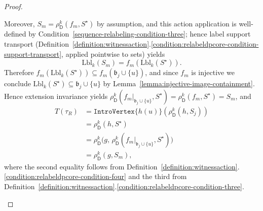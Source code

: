 \documentclass[10pt,a4paper]{amsart}
\newcommand{\abag}{\mathfrak{b}}
\newcommand{\abstractdecomposition}{\tau}
\newcommand{\action}{\rho}
\newcommand{\dpcore}{\mathsf{D}}
\newcommand{\dprefutation}{R}
\newcommand{\introvertextype}[1]{\mathtt{IntroVertex}\{#1\}}
\newcommand{\relabelingfunction}{f}
\newcommand{\subtermToBag}{T}
\newcommand{\treewidthvalue}{k}
\newcommand{\vertexone}{u}
\newcommand{\witnessset}{S}
\begin{document}
\begin{proof}
\begin{enumerate}
	Moreover, $\witnessset_m=\action_{\dpcore}^{\treewidthvalue}(\relabelingfunction_m,S^\star)$ by assumption, and this action application is well-defined by Condition~\ref{sequence-relabeling-condition-three}; hence label support transport (Definition~\ref{definition:witnessaction}.\ref{condition:relabeldpcore-condition-support-transport}, applied pointwise to sets) yields
	\[
	\mathrm{Lbl}_{\treewidthvalue}(\witnessset_m)=\relabelingfunction_m(\mathrm{Lbl}_{\treewidthvalue}(S^\star)).
	\]
	Therefore $\relabelingfunction_m(\mathrm{Lbl}_{\treewidthvalue}(S^\star))\subseteq \relabelingfunction_m(\abag_j\cup\{\vertexone\})$, and since $\relabelingfunction_m$ is injective we conclude $\mathrm{Lbl}_{\treewidthvalue}(S^\star)\subseteq \abag_j\cup\{\vertexone\}$ by Lemma~\ref{lemma:injective-image-containment}.
	Hence extension invariance yields $\action_{\dpcore}^{\treewidthvalue}(\relabelingfunction_m|_{\abag_j\cup\{\vertexone\}},S^\star)=\action_{\dpcore}^{\treewidthvalue}(\relabelingfunction_m,S^\star)=\witnessset_m$, and
		\[
		\begin{aligned}
		\subtermToBag(\abstractdecomposition_{\dprefutation})
		&= \introvertextype{h(\vertexone)}(\action_{\dpcore}^{\treewidthvalue}(h,\witnessset_j))\\
		&= \action_{\dpcore}^{\treewidthvalue}(h,S^\star)\\
		&= \action_{\dpcore}^{\treewidthvalue}\bigl(g,\,\action_{\dpcore}^{\treewidthvalue}(\relabelingfunction_m|_{\abag_j\cup\{\vertexone\}},S^\star)\bigr)\\
		&= \action_{\dpcore}^{\treewidthvalue}(g,\witnessset_m),
		\end{aligned}
		\]
	where the second equality follows from Definition~\ref{definition:witnessaction}.\ref{condition:relabeldpcore-condition-four} and the third from Definition~\ref{definition:witnessaction}.\ref{condition:relabeldpcore-condition-three}.


\end{enumerate}
\end{proof}
\end{document}
